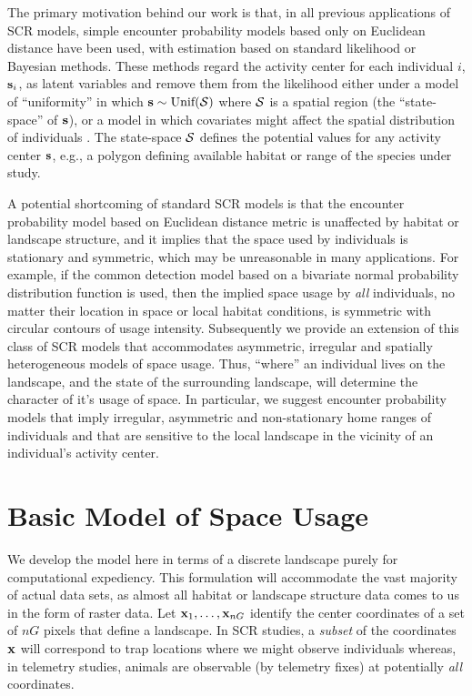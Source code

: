\documentclass[12pt]{article}
\begin{document}
The primary motivation behind our work is that, in all previous
applications of SCR models, simple encounter probability models based
only on Euclidean distance have been used, with estimation based on
standard likelihood or Bayesian methods. These methods regard the
activity center for each individual $i$, ${\bf s}_{i}$, as latent
variables and remove them from the likelihood either under a model of
``uniformity'' in which ${\bf s} \sim \mbox{Unif}({\cal S})$ where
${\cal S}$ is a spatial region (the ``state-space'' of ${\bf s}$), or
a model in which covariates might affect the spatial distribution of
individuals \citep{borchers_efford:2008}. The state-space ${\cal S}$
defines the potential values for any activity center ${\bf s}$, e.g.,
a polygon defining available habitat or range of the species under
study.

A
potential shortcoming of 
standard SCR models is that the encounter
probability model based on Euclidean distance metric is unaffected by
habitat or landscape structure, and it implies that the space used by
individuals is stationary and symmetric, which may be unreasonable in
many applications.  For example, if the common detection model based
on a bivariate normal probability distribution function is used, then
the implied space usage by {\it all} individuals, no matter their
location in space or local habitat conditions, is symmetric with
circular contours of usage intensity.  Subsequently we provide an
extension of this class of SCR models that accommodates asymmetric,
irregular and spatially heterogeneous models of space usage.  Thus,
``where'' an individual lives on the landscape, and the state of the
surrounding landscape, will determine the character of it's usage of
space. In particular, we suggest encounter probability models that
imply irregular, asymmetric and non-stationary home ranges of
individuals and that are sensitive to the local landscape in the
vicinity of an individual's activity center.

\section{Basic Model of Space Usage}
\label{rsf.sec.rsfmodel}

We develop the model here in terms of a discrete landscape purely for
computational expediency. This formulation will accommodate the vast
majority of actual data sets, as almost all habitat or landscape
structure data comes to us in the form of raster data.  Let ${\bf
  x}_{1},\ldots,{\bf x}_{nG}$ identify the center coordinates of a set
of $nG$ pixels that define a landscape.  In SCR studies, a {\it
  subset} of the coordinates ${\bf x}$ will correspond to trap
locations where we might observe individuals whereas, in telemetry
studies, animals are observable (by telemetry fixes) at potentially
{\it all} coordinates.
\end{document}
